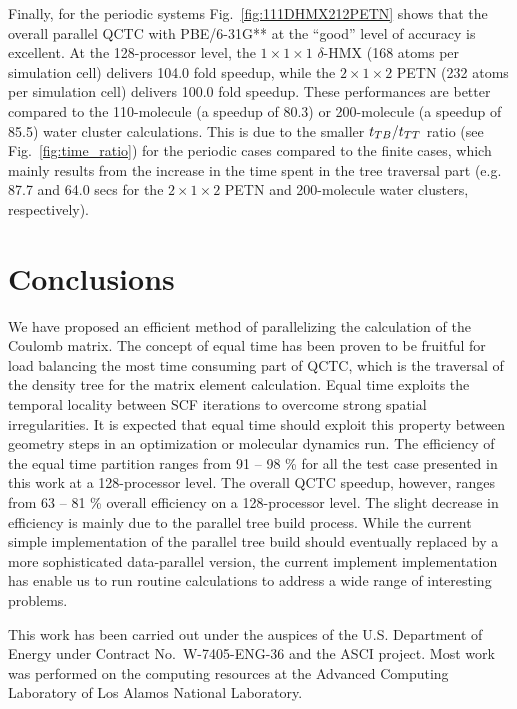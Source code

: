 \commentoutA{\documentclass[prl,aps,twocolumn,twocolumngrid,superbib]{revtex4}}
\begin{document}
Finally, for the periodic systems Fig.~\ref{fig:111DHMX212PETN} shows
that the overall parallel QCTC with PBE/6-31G** at the ``good'' level
of accuracy is excellent. At the 128-processor level, the $1\times
1\times 1$ $\delta$-HMX (168 atoms per simulation cell) delivers 104.0
fold speedup, while the $2\times 1 \times 2$ PETN (232 atoms per
simulation cell) delivers 100.0 fold speedup. These performances are
better compared to the 110-molecule (a speedup of 80.3) or
200-molecule (a speedup of 85.5) water cluster calculations. This is
due to the smaller $t_{TB}/t_{TT}$ ratio (see Fig.~\ref{fig:time_ratio})
for the periodic cases compared to the finite cases, which mainly
results from the increase in the time spent in the tree traversal part
(e.g. 87.7 and 64.0 secs for the $2\times 1 \times 2$ PETN and 200-molecule
water clusters, respectively).

\section{Conclusions}
\label{conclusions}
We have proposed an efficient method of parallelizing the calculation
of the Coulomb matrix. The concept of equal time has been proven to be
fruitful for load balancing the most time consuming part of QCTC,
which is the traversal of the density tree for the matrix element
calculation. 
Equal time exploits the temporal locality between SCF iterations 
to overcome strong spatial irregularities. It is expected that equal
time should exploit this property between geometry steps in an
optimization or molecular dynamics run.
The efficiency of the equal time partition ranges from 91
-- 98 \% for all the test case presented in this work at a
128-processor level. The overall QCTC speedup, however, ranges from 63
-- 81 \% overall efficiency on a 128-processor level. The slight
decrease in efficiency is mainly due to the parallel tree build
process.  While the current simple implementation of the parallel tree
build should eventually replaced by a more sophisticated data-parallel
version, the current implement implementation has enable us to run
routine calculations to address a wide range of interesting problems.

\begin{acknowledgments}
This work has been carried out under the auspices of the
U.S. Department of Energy under Contract No.~W-7405-ENG-36 and the
ASCI project.  Most work was performed on the computing resources at
the Advanced Computing Laboratory of Los Alamos National Laboratory.
\end{acknowledgments}

 
\end{document}

